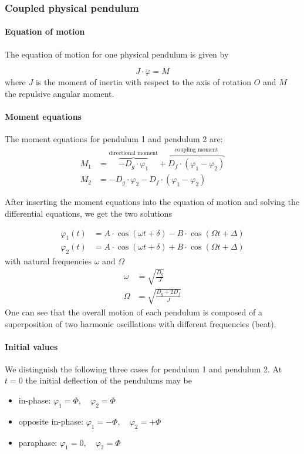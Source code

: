 \documentclass{scrreprt}
\renewcommand{\phi}{\varphi}
\begin{document}
\subsubsection{Coupled physical pendulum}

\paragraph{Equation of motion}
The equation of motion for one physical pendulum is given by

\begin{equation}
J\cdot \ddot{\phi} = M
\end{equation}
where $J$ is the moment of inertia with respect to the axis of rotation $O$ and $M$ the repulsive angular moment.

\paragraph{Moment equations}
The moment equations for pendulum 1 and pendulum 2 are:
\begin{align}
M_1 &= \overbrace{-D_g\cdot \phi_1}^{\text{directional moment}} + \overbrace{D_f \cdot (\phi_1 - \phi_2)}^{\text{coupling moment}}  \\
M_2 &= -D_g\cdot \phi_2 - D_f \cdot (\phi_1 - \phi_2)
\end{align}

After inserting the moment equations into the equation of motion and solving the differential equations, we get the two solutions

\begin{align}
\phi_1(t) &= A \cdot \cos{(\omega t + \delta)} - B \cdot \cos{(\Omega t + \Delta)}\\
\phi_2(t) &= A \cdot \cos{(\omega t + \delta)} + B \cdot \cos{(\Omega t + \Delta)}
\end{align}
with natural frequencies $\omega$ and $\Omega$
\begin{align}
\omega &= \sqrt{\frac{D_g}{J}}\\
\Omega &= \sqrt{\frac{D_g+2 D_f}{J}}
\end{align}
One can see that the overall motion of each pendulum is composed of a superposition of two harmonic oscillations with different frequencies (beat).

\paragraph{Initial values}
We distinguish the following three cases for pendulum 1 and pendulum 2. At $t=0$ the initial deflection of the pendulums may be
\begin{itemize}
\item in-phase: $\phi_1 = \Phi, \quad \phi_2 = \Phi$
\item opposite in-phase: $\phi_1 = -\Phi, \quad \phi_2 = +\Phi$
\item paraphase: $\phi_1 = 0, \quad \phi_2 = \Phi$
\end{itemize}
\end{document}
